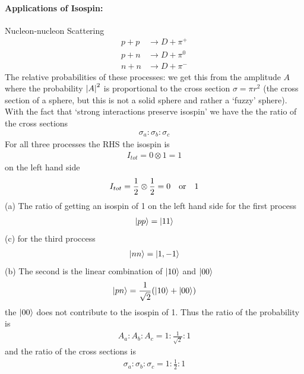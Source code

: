 \documentclass[../main.tex]{subfiles}
\begin{document}
\paragraph{Applications of Isospin:} Nucleon-nucleon Scattering
\begin{align*}
    p + p &\rightarrow D + \pi^+ \\
    p + n &\rightarrow D + \pi^0 \\
    n + n &\rightarrow D + \pi^-
\end{align*}
The relative probabilities of these processes: we get this from the amplitude $A$ where the 
probability $\abs{A}^2$ is proportional to the cross section $\sigma = \pi r^2$ (the cross section
of a sphere, but this is not a solid sphere and rather a `fuzzy' sphere). With the fact that `strong
interactions preserve isospin' we have the the ratio of the cross sections
\begin{align*}
    \sigma_a : \sigma_b : \sigma_c
\end{align*}
For all three processes the RHS the isospin is
\begin{align*}
    I_{tot} = 0 \otimes 1 = 1
\end{align*}
on the left hand side 
\begin{align*}
    I_{tot} = \frac{1}{2} \otimes \frac{1}{2} = 0 \qor 1
\end{align*}
(a) The ratio of getting an isospin of 1 on the left hand side for the first process
\begin{align*}
    \ket{pp} = \ket{11}
\end{align*}
(c) for the third proccess
\begin{align*}
    \ket{nn} = \ket{1, -1}
\end{align*}
(b) The second is the linear combination of $\ket{10}$ and $\ket{00}$
\begin{align*}
    \ket{pn} = \frac{1}{\sqrt{2}} (\ket{10} + \ket{00})
\end{align*}
the $\ket{00}$ does not contribute to the isospin of 1. Thus the ratio of the probability is
\begin{align*}
    A_a : A_b : A_c = 1 : \frac{1}{\sqrt{2}} : 1
\end{align*}
and the ratio of the cross sections is
\begin{align*}
    \sigma_a : \sigma_b : \sigma_c = 1 : \frac{1}{2} : 1
\end{align*}
\end{document}
